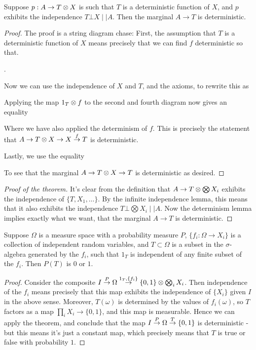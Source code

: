 \documentclass{article}
\begin{document}
\begin{lemma}
    Suppose $p: A \to T \otimes X$ is such that $T$ is a deterministic function of $X$, and $p$ exhibits the independence $T \bot X \mid \mid A$.
    Then the marginal $A \to T$ is deterministic.
\end{lemma}
\begin{proof}
The proof is a string diagram chase:
First, the assumption that $T$ is a deterministic function of $X$ means precisely that we can find $f$ deterministic so that.

.

Now we can use the independence of $X$ and $T$, and the axioms, to rewrite this as


Applying the map $1_T \otimes f$ to the second and fourth diagram now gives an equality


Where we have also applied the determinism of $f$.
This is precisely the statement that $A \to T \otimes X \to X \overset{f}{\to} T$ is deterministic.

Lastly, we use the equality 


To see that the marginal $A \to T \otimes X \to T$ is deterministic as desired.

\end{proof}


\begin{proof}[Proof of the theorem]
    It's clear from the definition that $A \to T \otimes \bigotimes X_i$ exhibits the independence of $\{T, X_1, \dots\}$.
    By the infinite independence lemma, this means that it also exhibits the independence $T \bot \bigotimes X_i \mid \mid A$.
    Now the determinism lemma implies exactly what we want, that the marginal $A \to T$ is deterministic.
\end{proof}

\begin{corollary}
    Suppose $\Omega$ is a measure space with a probability measure $P$, $\{f_i: \Omega \to X_i\}$ is a collection of independent random variables,
    and $T \subset \Omega$ is a subset in the $\sigma$-algebra generated by the $f_i$, such that $1_T$ is independent of any finite subset of the $f_i$.
    Then $P(T)$ is $0$ or $1$.
\end{corollary}
\begin{proof}
    Consider the composite $I \overset{P}{\to} \Omega \overset{1_T, \{f_i\}}{\to} \{0,1\} \otimes \bigotimes_i X_i$.
    Then independence of the $f_i$ means precisely that this map exhibits the independence of $\{X_i\}$ given $I$ in the above sense.
    Moreover, $T(\omega)$ is determined by the values of $f_i(\omega)$, so $T$ factors as a map $\prod_i X_i \to \{0,1\}$, and
    this map is measurable.
    Hence we can apply the theorem, and conclude that the map $I \overset{P}{\to} \Omega \overset{T}{\to} \{0,1\}$ is deterministic - but this means it's just a constant map,
    which precisely means that $T$ is true or false with probability $1$.
\end{proof}
\end{document}
